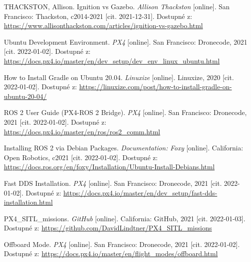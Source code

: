 \begin{thebibliography}{99}
THACKSTON, Allison. Ignition vs Gazebo. \textit{Allison Thackston} [online]. San Francisco: Thackston, c2014-2021 [cit. 2021-12-31]. Dostupné z: \href{https://www.allisonthackston.com/articles/ignition-vs-gazebo.html}{https://www.allisonthackston.com/articles/ignition-vs-gazebo.html}

Ubuntu Development Environment. \textit{PX4} [online]. San Francisco: Dronecode, 2021 [cit. 2022-01-02]. Dostupné z: \href{https://docs.px4.io/master/en/dev\_setup/dev\_env\_linux\_ubuntu.html}{https://docs.px4.io/master/en/dev\_setup/dev\_env\_linux\_ubuntu.html}

How to Install Gradle on Ubuntu 20.04. \textit{Linuxize} [online]. Linuxize, 2020 [cit. 2022-01-02]. Dostupné z: \href{https://linuxize.com/post/how-to-install-gradle-on-ubuntu-20-04/}{https://linuxize.com/post/how-to-install-gradle-on-ubuntu-20-04/}

ROS 2 User Guide (PX4-ROS 2 Bridge). \textit{PX4} [online]. San Francisco: Dronecode, 2021 [cit. 2022-01-02]. Dostupné z: \href{https://docs.px4.io/master/en/ros/ros2\_comm.html}{https://docs.px4.io/master/en/ros/ros2\_comm.html}


Installing ROS 2 via Debian Packages. \textit{Documentation: Foxy} [online]. California: Open Robotics, c2021 [cit. 2022-01-02]. Dostupné z: \href{https://docs.ros.org/en/foxy/Installation/Ubuntu-Install-Debians.html}{https://docs.ros.org/en/foxy/Installation/Ubuntu-Install-Debians.html}

Fast DDS Installation. \textit{PX4} [online]. San Francisco: Dronecode, 2021 [cit. 2022-01-02]. Dostupné z: \href{https://docs.px4.io/master/en/dev\_setup/fast-dds-installation.html}{https://docs.px4.io/master/en/dev\_setup/fast-dds-installation.html}

PX4\_SITL\_missions. \textit{GitHub} [online]. California: GitHub, 2021 [cit. 2022-01-03]. Dostupné z: \href{https://github.com/DavidLindtner/PX4\_SITL\_missions}{https://github.com/DavidLindtner/PX4\_SITL\_missions}

Offboard Mode. \textit{PX4} [online]. San Francisco: Dronecode, 2021 [cit. 2022-01-02]. Dostupné z: \href{https://docs.px4.io/master/en/flight\_modes/offboard.html}{https://docs.px4.io/master/en/flight\_modes/offboard.html}





\end{thebibliography}
